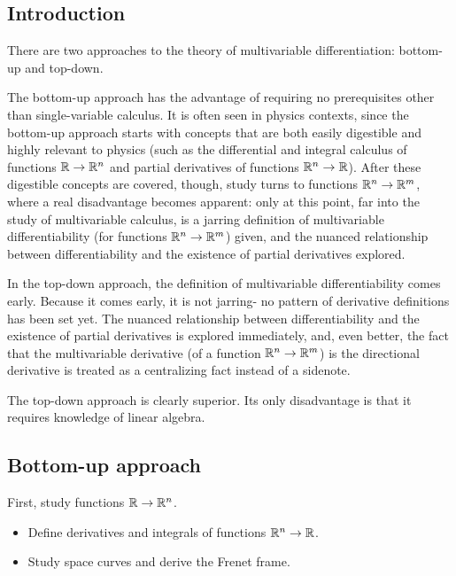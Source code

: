 \subsection*{Introduction}

There are two approaches to the theory of multivariable differentiation: bottom-up and top-down.

The bottom-up approach has the advantage of requiring no prerequisites other than single-variable calculus. It is often seen in physics contexts, since the bottom-up approach starts with concepts that are both easily digestible and highly relevant to physics (such as the differential and integral calculus of functions $\mathbb{R} \rightarrow \mathbb{R}^n$ and partial derivatives of functions $\mathbb{R}^n \rightarrow \mathbb{R}$). After these digestible concepts are covered, though, study turns to functions $\mathbb{R}^n \rightarrow \mathbb{R}^m$, where a real disadvantage becomes apparent: only at this point, far into the study of multivariable calculus, is a jarring definition of multivariable differentiability (for functions $\mathbb{R}^n \rightarrow \mathbb{R}^m$) given, and the nuanced relationship between differentiability and the existence of partial derivatives explored.

In the top-down approach, the definition of multivariable differentiability comes early. Because it comes early, it is not jarring- no pattern of derivative definitions has been set yet. The nuanced relationship between differentiability and the existence of partial derivatives is explored immediately, and, even better, the fact that the multivariable derivative (of a function $\mathbb{R}^n \rightarrow \mathbb{R}^m$) is the directional derivative is treated as a centralizing fact instead of a sidenote. 

The top-down approach is clearly superior. Its only disadvantage is that it requires knowledge of linear algebra.

\subsection*{Bottom-up approach}

First, study functions $\mathbb{R} \rightarrow \mathbb{R}^n$.

\begin{itemize}
    \item Define derivatives and integrals of functions $\mathbb{R}^n \rightarrow \mathbb{R}$. 
    \item Study space curves and derive the Frenet frame.
\end{itemize}

